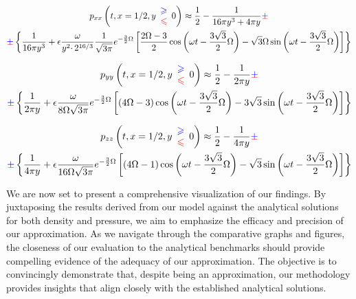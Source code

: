 \begin{multline}
p_{xx}\left( t,x=1/2,y\begin{array}{ c }
\textcolor[rgb]{0,0,1}{\geqslant }\\
\textcolor[rgb]{1,0,0}{\leqslant }
\end{array} 0\right)
\approx
\frac{1}{2} -\frac{1}{16\pi y^{3} +4\pi y} \cpm \\
\cpm \left\{\frac{1}{16\pi y^{3}} +\epsilon \frac{\omega }{y^{2} \cdotp 2^{16/3}}\frac{1}{\sqrt{3\pi }} e^{-\frac{3}{2} \Omega }\left[\frac{2\Omega -3}{2}\cos\left( \omega t-\frac{3\sqrt{3}}{2} \Omega \right) -\sqrt{3} \Omega \sin\left( \omega t-\frac{3\sqrt{3}}{2} \Omega \right)\right]\right\}
\end{multline}

\begin{multline}
p_{yy}\left( t,x=1/2,y\begin{array}{ c }
\textcolor[rgb]{0,0,1}{\geqslant }\\
\textcolor[rgb]{1,0,0}{\leqslant }
\end{array} 0\right)
\approx
\frac{1}{2} -\frac{1}{2\pi y} \cpm \\
\cpm \left\{\frac{1}{2\pi y} +\epsilon \frac{\omega }{8\Omega \sqrt{3\pi }} e^{-\frac{3}{2} \Omega }\left[( 4\Omega -3)\cos\left( \omega t-\frac{3\sqrt{3}}{2} \Omega \right) -3\sqrt{3}\sin\left( \omega t-\frac{3\sqrt{3}}{2} \Omega \right)\right]\right\}
\end{multline}

\begin{multline}
p_{zz}\left( t,x=1/2,y\begin{array}{ c }
\textcolor[rgb]{0,0,1}{\geqslant }\\
\textcolor[rgb]{1,0,0}{\leqslant }
\end{array} 0\right)
\approx
\frac{1}{2} -\frac{1}{4\pi y} \cpm \\
\cpm \left\{\frac{1}{4\pi y} +\epsilon \frac{\omega }{16\Omega \sqrt{3\pi }} e^{-\frac{3}{2} \Omega }\left[( 4\Omega -1)\cos\left( \omega t-\frac{3\sqrt{3}}{2} \Omega \right) -\sqrt{3}\sin\left( \omega t-\frac{3\sqrt{3}}{2} \Omega \right)\right]\right\}
\end{multline}

We are now set to present a comprehensive visualization of our findings. By juxtaposing the results derived from our model against the analytical solutions for both density and pressure, we aim to emphasize the efficacy and precision of our approximation. As we navigate through the comparative graphs and figures, the closeness of our evaluation to the analytical benchmarks should provide compelling evidence of the adequacy of our approximation. The objective is to convincingly demonstrate that, despite being an approximation, our methodology provides insights that align closely with the established analytical solutions.

